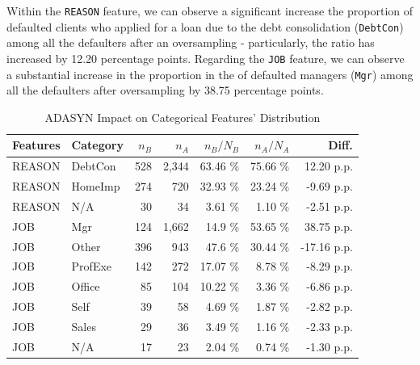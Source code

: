 Within the \texttt{REASON} feature, we can observe a significant increase the proportion of defaulted clients who applied for a loan due to the debt consolidation (\texttt{DebtCon}) among all the defaulters after an oversampling - particularly, the ratio has increased by 12.20 percentage points.
Regarding the \texttt{JOB} feature, we can observe a substantial increase in the proportion in the of defaulted managers (\texttt{Mgr}) among all the defaulters after oversampling by 38.75 percentage points.
\begin{table}[H]
    \small
    \setlength{\tabcolsep}{8pt}
    \renewcommand{\arraystretch}{1.3}
    \centering
    \caption[ADASYN Impact on Categorical Features' Distribution]{ADASYN Impact on Categorical Features' Distribution}\label{tab:adasynimpact}
    \begin{tabular}{ll|rr|rr|r}
    
        \hline
    \textbf{Features} & \textbf{Category} & \textbf{$n_{B}$} & \textbf{$n_{A}$} & \textbf{$n_{B} / N_{B}$} & \textbf{$n_{A} / N_{A}$} & \textbf{Diff.} \\ 
    \midrule
    \midrule
    REASON & DebtCon & 528 & 2,344 & 63.46 \% & 75.66 \% & 12.20 p.p. \\ 
    REASON & HomeImp & 274 & 720 & 32.93 \% & 23.24 \% & -9.69 p.p. \\
    REASON & N/A & 30 & 34 & 3.61 \% & 1.10 \% & -2.51 p.p. \\
    \hline
    JOB & Mgr & 124 & 1,662 & 14.9 \% & 53.65 \% & 38.75 p.p. \\ 
    JOB & Other & 396 & 943 & 47.6 \% & 30.44 \% & -17.16 p.p. \\ 
    JOB & ProfExe & 142 & 272 & 17.07 \% & 8.78 \% & -8.29 p.p. \\ 
    JOB & Office & 85 & 104 & 10.22 \% & 3.36 \% & -6.86 p.p. \\ 
    JOB & Self & 39 & 58 & 4.69 \% & 1.87 \% & -2.82 p.p. \\
    JOB & Sales & 29 & 36 & 3.49 \% & 1.16 \% & -2.33 p.p. \\ 
    JOB & N/A & 17 & 23 & 2.04 \% & 0.74 \% & -1.30 p.p. \\ 
    \hline
    \bottomrule
    \end{tabular}
    \vspace{0.7em}
    
    \vspace{-1em}
\end{table}

